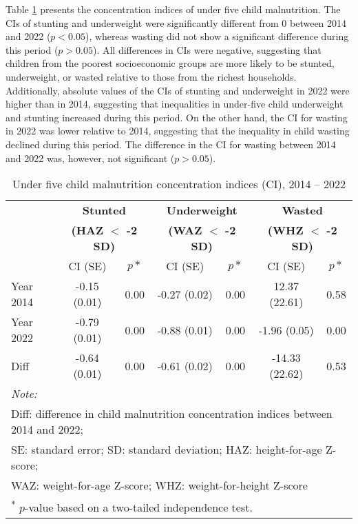 \documentclass[sn-basic,Numbered,pdflatex]{sn-jnl}
\theoremstyle{remark}
\theoremstyle{definition}
\begin{document}
Table \ref{tab:three} presents the concentration indices of under five
child malnutrition. The CIs of stunting and underweight were
significantly different from 0 between 2014 and 2022 (\(p < 0.05\)),
whereas wasting did not show a significant difference during this period
(\(p > 0.05\)). All differences in CIs were negative, suggesting that
children from the poorest socioeconomic groups are more likely to be
stunted, underweight, or wasted relative to those from the richest
households. Additionally, absolute values of the CIs of stunting and
underweight in 2022 were higher than in 2014, suggesting that
inequalities in under-five child underweight and stunting increased
during this period. On the other hand, the CI for wasting in 2022 was
lower relative to 2014, suggesting that the inequality in child wasting
declined during this period. The difference in the CI for wasting
between 2014 and 2022 was, however, not significant (\(p > 0.05\)).

\begin{table}[!h]

\caption{\label{tab:three}Under five child malnutrition concentration indices (CI), 2014 -- 2022}
\centering
\begin{tabular}[t]{lcccccc}
\toprule
\multicolumn{1}{c}{\textbf{ }} & \multicolumn{2}{c}{\textbf{Stunted}} & \multicolumn{2}{c}{\textbf{Underweight}} & \multicolumn{2}{c}{\textbf{Wasted}} \\
\cmidrule(l{3pt}r{3pt}){2-3} \cmidrule(l{3pt}r{3pt}){4-5} \cmidrule(l{3pt}r{3pt}){6-7}
\multicolumn{1}{c}{\textbf{ }} & \multicolumn{2}{c}{\textbf{(HAZ $<$ -2 SD)}} & \multicolumn{2}{c}{\textbf{(WAZ $<$ -2 SD)}} & \multicolumn{2}{c}{\textbf{(WHZ $<$ -2 SD)}} \\
\cmidrule(l{3pt}r{3pt}){2-3} \cmidrule(l{3pt}r{3pt}){4-5} \cmidrule(l{3pt}r{3pt}){6-7}
  & CI (SE) & $p*$ & CI (SE) & $p*$ & CI (SE) & $p*$\\
\midrule
Year 2014 & -0.15 (0.01) & 0.00 & -0.27 (0.02) & 0.00 & 12.37 (22.61) & 0.58\\
Year 2022 & -0.79 (0.01) & 0.00 & -0.88 (0.01) & 0.00 & -1.96 (0.05) & 0.00\\
Diff & -0.64 (0.01) & 0.00 & -0.61 (0.02) & 0.00 & -14.33 (22.62) & 0.53\\
\bottomrule
\multicolumn{7}{l}{\rule{0pt}{1em}\textit{Note: }}\\
\multicolumn{7}{l}{\rule{0pt}{1em}Diff: difference in child malnutrition concentration indices between 2014 and 2022;}\\
\multicolumn{7}{l}{\rule{0pt}{1em}SE: standard error; SD: standard deviation; HAZ: height-for-age Z-score;}\\
\multicolumn{7}{l}{\rule{0pt}{1em}WAZ: weight-for-age Z-score; WHZ: weight-for-height Z-score}\\
\multicolumn{7}{l}{\rule{0pt}{1em}\textsuperscript{*} $p$-value based on a two-tailed independence test.}\\
\end{tabular}
\end{table}
\end{document}
